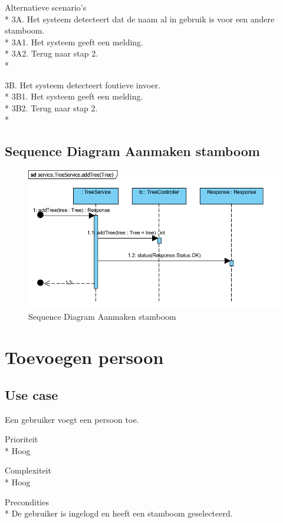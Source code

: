 \documentclass[pdftex,a4paper,12pt,twoside]{report}
\begin{document}
Alternatieve scenario’s\\*
3A. Het systeem detecteert dat de naam al in gebruik is voor een andere stamboom.\\*
3A1. Het systeem geeft een melding.\\*
3A2. Terug naar stap 2.\\*

3B. Het systeem detecteert foutieve invoer.\\*
3B1. Het systeem geeft een melding.\\*
3B2. Terug naar stap 2.\\*

\subsection{Sequence Diagram Aanmaken stamboom}
\begin{figure}[!htb]
\includegraphics[width=\textwidth]{images/aanmakentree.png}
\caption{Sequence Diagram Aanmaken stamboom}
\end{figure}

\newpage
\section{Toevoegen persoon}
\subsection{Use case}
Een gebruiker voegt een persoon toe.

Prioriteit\\*
Hoog

Complexiteit\\*
Hoog

Precondities \\*
De gebruiker is ingelogd en heeft een stamboom geselecteerd.
\end{document}
